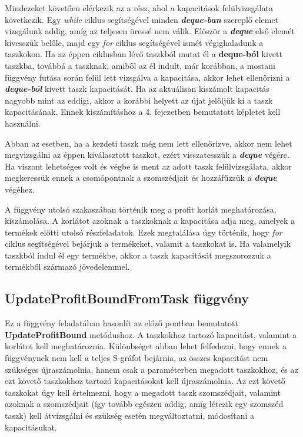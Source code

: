 Mindezeket követően elérkezik az a rész, ahol a kapacitások felülvizsgálata következik.
Egy \textit{while} ciklus segítségével minden \textbf{\textit{deque-ban}} szereplő elemet vizsgálunk addig, amíg az teljesen üressé nem válik.
Először a \textbf{\textit{deque}} első elemét kivesszük belőle, majd egy \textit{for} ciklus segítségével ismét végighaladunk a taszkokon.
Ha az éppen ciklusban lévő taszkból mutat él a \textbf{deque-ból} kivett taszkba, továbbá a taszknak, amiből az él indult, már korábban, a mostani függvény futása során felül lett vizsgálva a kapacitása, akkor lehet ellenőrizni a \textbf{\textit{deque-ból}} kivett taszk kapacitását.
Ha az aktuálisan kiszámolt kapacitás nagyobb mint az eddigi, akkor a korábbi helyett az újat jelöljük ki a taszk kapacitásának.
Ennek kiszámításhoz a 4. fejezetben bemutatott képletet kell használni.

Abban az esetben, ha a kezdeti taszk még nem lett ellenőrizve, akkor nem lehet megvizsgálni az éppen kiválasztott taszkot, ezért visszatesszük a \textbf{\textit{deque}} végére.
Ha viszont lehetséges volt és végbe is ment az adott taszk felülvizsgálata, akkor megkeressük ennek a csomópontnak a szomszédjait és hozzáfűzzük a \textbf{\textit{deque}} végéhez.

A függvény utolsó szakaszában történik meg a profit korlát meghatározása, kiszámolása.
A korlátot azoknak a taszkoknak a kapacitása adja meg, amelyek a termékek előtti utolsó részfeladatok.
Ezek megtalálása úgy történik, hogy \textit{for} ciklus segítségével bejárjuk a termékeket, valamit a taszkokat is.
Ha valamelyik taszkból indul él egy termékbe, akkor a taszk kapacitását megszorozzuk a termékből származó jövedelemmel.

\subsection{UpdateProfitBoundFromTask függvény}
Ez a függvény feladatában hasonlít az előző pontban bemutatott \textbf{UpdateProfitBound} metódushoz.
A taszkokhoz tartozó kapacitást, valamint a korlátot kell meghatároznia.
Különbséget abban lehet felfedezni, hogy ennek a függvénynek nem kell a teljes S-gráfot bejárnia, az összes kapacitást nem szükséges újraszámolnia, hanem csak a paraméterben megadott taszkokhoz, és az ezt követő taszkokhoz tartozó kapacitásokat kell újraszámolnia.
Az ezt követő taszkokat úgy kell értelmezni, hogy a megadott taszk szomszédjait, valamint azoknak a szomszédjait (így tovább egészen addig, amíg létezik egy szomszéd taszk) kell átvizsgálni és szükség esetén megváltoztatni, módosítani a kapacitásukat.


